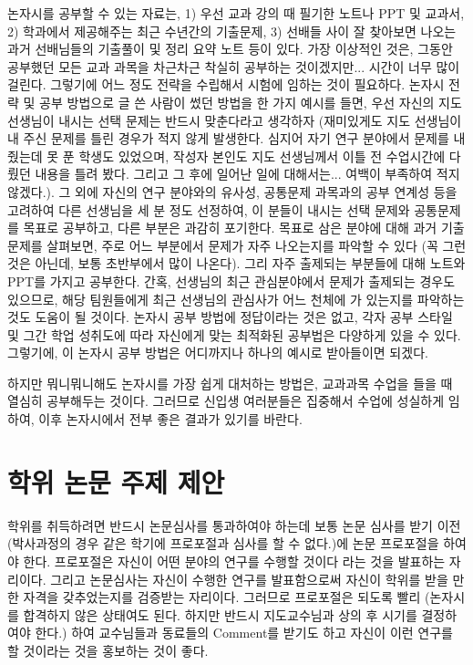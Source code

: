 논자시를 공부할 수 있는 자료는, 1) 우선 교과 강의 때 필기한 노트나 PPT 및
교과서, 2) 학과에서 제공해주는 최근 수년간의 기출문제, 3) 선배들 사이 잘 찾아보면
나오는 과거 선배님들의 기출풀이 및 정리 요약 노트 등이 있다. 가장 이상적인 것은,
그동안 공부했던 모든 교과 과목을 차근차근 착실히 공부하는 것이겠지만... 시간이
너무 많이 걸린다. 그렇기에 어느 정도 전략을 수립해서 시험에 임하는 것이
필요하다.  논자시 전략 및 공부 방법으로 글 쓴 사람이 썼던 방법을 한 가지 예시를
들면, 우선 자신의 지도 선생님이 내시는 선택 문제는 반드시 맞춘다라고 생각하자
(재미있게도 지도 선생님이 내 주신 문제를 틀린 경우가 적지 않게 발생한다. 심지어
자기 연구 분야에서 문제를 내줬는데 못 푼 학생도 있었으며, 작성자 본인도 지도
선생님께서 이틀 전 수업시간에 다뤘던 내용을 틀려 봤다. 그리고 그 후에 일어난 일에
대해서는... 여백이 부족하여 적지 않겠다.).  그 외에 자신의 연구 분야와의 유사성,
공통문제 과목과의 공부 연계성 등을 고려하여 다른 선생님을 세 분 정도 선정하여, 이
분들이 내시는 선택 문제와 공통문제를 목표로 공부하고, 다른 부분은 과감히
포기한다. 목표로 삼은 분야에 대해 과거 기출문제를 살펴보면, 주로 어느 부분에서
문제가 자주 나오는지를 파악할 수 있다 (꼭 그런 것은 아닌데, 보통 초반부에서 많이
나온다). 그리 자주 출제되는 부분들에 대해 노트와 PPT를 가지고 공부한다. 간혹,
선생님의 최근 관심분야에서 문제가 출제되는 경우도 있으므로, 해당 팀원들에게 최근
선생님의 관심사가 어느 천체에 가 있는지를 파악하는 것도 도움이 될 것이다. 논자시
공부 방법에 정답이라는 것은 없고, 각자 공부 스타일 및 그간 학업 성취도에 따라
자신에게 맞는 최적화된 공부법은 다양하게 있을 수 있다. 그렇기에, 이 논자시 공부
방법은 어디까지나 하나의 예시로 받아들이면 되겠다.

하지만 뭐니뭐니해도 논자시를 가장 쉽게 대처하는 방법은, 교과과목 수업을 들을 때
열심히 공부해두는 것이다. 그러므로 신입생 여러분들은 집중해서 수업에 성실하게
임하여, 이후 논자시에서 전부 좋은 결과가 있기를 바란다.
 

\section{학위 논문 주제 제안}
학위를 취득하려면 반드시 논문심사를 통과하여야 하는데 보통 논문 심사를 받기 이전
(박사과정의 경우 같은 학기에 프로포절과 심사를 할 수 없다.)에 논문 프로포절을
하여야 한다. 프로포절은 자신이 어떤 분야의 연구를 수행할 것이다 라는 것을
발표하는 자리이다. 그리고 논문심사는 자신이 수행한 연구를 발표함으로써 자신이
학위를 받을 만한 자격을 갖추었는지를 검증받는 자리이다. 그러므로 프로포절은
되도록 빨리 (논자시를 합격하지 않은 상태여도 된다. 하지만 반드시 지도교수님과
상의 후 시기를 결정하여야 한다.) 하여 교수님들과 동료들의 Comment를 받기도 하고
자신이 이런 연구를 할 것이라는 것을 홍보하는 것이 좋다.

